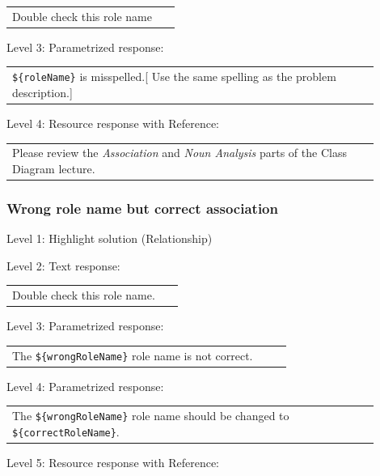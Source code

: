 \begin{tabular}{|p{0.9\linewidth}}
Double check this role name
\end{tabular} \medskip

\noindent Level 3: Parametrized response: \medskip

\begin{tabular}{|p{0.9\linewidth}}
\verb|${roleName}| is misspelled.[ Use the same spelling as the problem description.]
\end{tabular} \medskip

\noindent Level 4: Resource response with Reference: \medskip

\begin{tabular}{|p{0.9\linewidth}}
Please review the \textit{Association} and \textit{Noun Analysis} parts of the Class Diagram lecture.
\end{tabular} \medskip


\subsubsection{Wrong role name but correct association}

\noindent Level 1: Highlight solution (Relationship) \medskip

\noindent Level 2: Text response: \medskip

\begin{tabular}{|p{0.9\linewidth}}
Double check this role name.
\end{tabular} \medskip

\noindent Level 3: Parametrized response: \medskip

\begin{tabular}{|p{0.9\linewidth}}
The \verb|${wrongRoleName}| role name is not correct.
\end{tabular} \medskip

\noindent Level 4: Parametrized response: \medskip

\begin{tabular}{|p{0.9\linewidth}}
The \verb|${wrongRoleName}| role name should be changed to \verb|${correctRoleName}|.
\end{tabular} \medskip

\noindent Level 5: Resource response with Reference: \medskip

